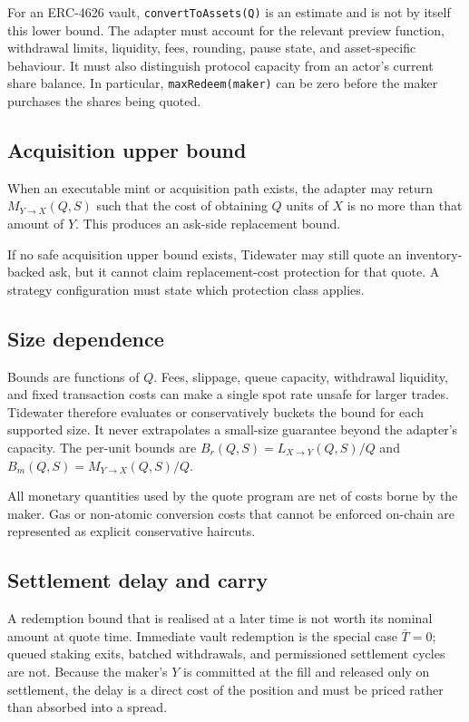 \documentclass[10pt,twocolumn]{article}
\theoremstyle{definition}
\newcommand{\Lb}{L_{X\to Y}}
\newcommand{\Mb}{M_{Y\to X}}
\newcommand{\Br}{B_{r}}
\newcommand{\Bm}{B_{m}}
\begin{document}
For an ERC-4626 vault, \texttt{convertToAssets(Q)} is an estimate and is not by itself this lower bound. The
adapter must account for the relevant preview function, withdrawal limits, liquidity, fees, rounding, pause state,
and asset-specific behaviour. It must also distinguish protocol capacity from an actor's current share balance. In
particular, \texttt{maxRedeem(maker)} can be zero before the maker purchases the shares being quoted.

\subsection{Acquisition upper bound}

When an executable mint or acquisition path exists, the adapter may return $\Mb(Q,S)$ such that the cost of
obtaining $Q$ units of $X$ is no more than that amount of $Y$. This produces an ask-side replacement bound.

If no safe acquisition upper bound exists, Tidewater may still quote an inventory-backed ask, but it cannot claim
replacement-cost protection for that quote. A strategy configuration must state which protection class applies.

\subsection{Size dependence}

Bounds are functions of $Q$. Fees, slippage, queue capacity, withdrawal liquidity, and fixed transaction costs can
make a single spot rate unsafe for larger trades. Tidewater therefore evaluates or conservatively buckets the
bound for each supported size. It never extrapolates a small-size guarantee beyond the adapter's capacity. The
per-unit bounds are $\Br(Q,S) = \Lb(Q,S)/Q$ and $\Bm(Q,S) = \Mb(Q,S)/Q$.

All monetary quantities used by the quote program are net of costs borne by the maker. Gas or non-atomic
conversion costs that cannot be enforced on-chain are represented as explicit conservative haircuts.

\subsection{Settlement delay and carry}
\label{sec:delay}

A redemption bound that is realised at a later time is not worth its nominal amount at quote time. Immediate
vault redemption is the special case $\bar{T}=0$; queued staking exits, batched withdrawals, and permissioned
settlement cycles are not. Because the maker's $Y$ is committed at the fill and released only on settlement, the
delay is a direct cost of the position and must be priced rather than absorbed into a spread.
\end{document}
